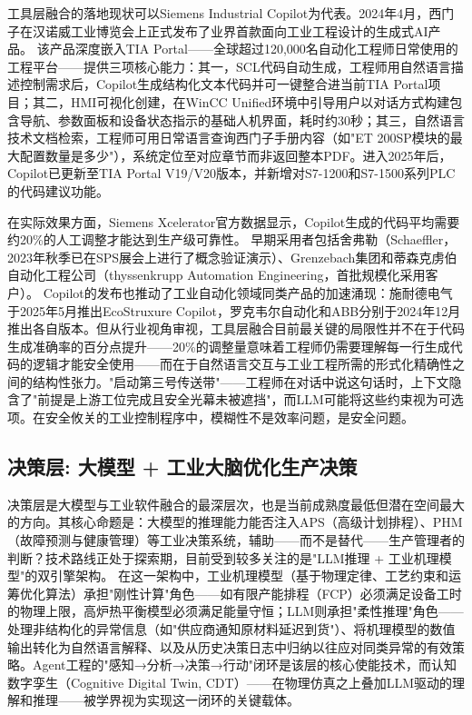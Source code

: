 \documentclass[12pt,a4paper]{ctexart}
\begin{document}
工具层融合的落地现状可以Siemens Industrial Copilot为代表。2024年4月，西门子在汉诺威工业博览会上正式发布了业界首款面向工业工程设计的生成式AI产品。\cite{siemens2024press} 该产品深度嵌入TIA Portal——全球超过120,000名自动化工程师日常使用的工程平台——提供三项核心能力：其一，SCL代码自动生成，工程师用自然语言描述控制需求后，Copilot生成结构化文本代码并可一键整合进当前TIA Portal项目；其二，HMI可视化创建，在WinCC Unified环境中引导用户以对话方式构建包含导航、参数面板和设备状态指示的基础人机界面，耗时约30秒；其三，自然语言技术文档检索，工程师可用日常语言查询西门子手册内容（如"ET 200SP模块的最大配置数量是多少"），系统定位至对应章节而非返回整本PDF。进入2025年后，Copilot已更新至TIA Portal V19/V20版本，并新增对S7-1200和S7-1500系列PLC的代码建议功能。\cite{devicebase2025copilot}

在实际效果方面，Siemens Xcelerator官方数据显示，Copilot生成的代码平均需要约20\%的人工调整才能达到生产级可靠性。\cite{siemens2024xcelerator} 早期采用者包括舍弗勒（Schaeffler，2023年秋季已在SPS展会上进行了概念验证演示）、Grenzebach集团和蒂森克虏伯自动化工程公司（thyssenkrupp Automation Engineering，首批规模化采用客户）。\cite{marketscreener2024siemens} Copilot的发布也推动了工业自动化领域同类产品的加速涌现：施耐德电气于2025年5月推出EcoStruxure Copilot，罗克韦尔自动化和ABB分别于2024年12月推出各自版本。但从行业视角审视，工具层融合目前最关键的局限性并不在于代码生成准确率的百分点提升——20\%的调整量意味着工程师仍需要理解每一行生成代码的逻辑才能安全使用——而在于自然语言交互与工业工程所需的形式化精确性之间的结构性张力。"启动第三号传送带"——工程师在对话中说这句话时，上下文隐含了"前提是上游工位完成且安全光幕未被遮挡"，而LLM可能将这些约束视为可选项。在安全攸关的工业控制程序中，模糊性不是效率问题，是安全问题。

\subsection{决策层: 大模型 + 工业大脑优化生产决策}

决策层是大模型与工业软件融合的最深层次，也是当前成熟度最低但潜在空间最大的方向。其核心命题是：大模型的推理能力能否注入APS（高级计划排程）、PHM（故障预测与健康管理）等工业决策系统，辅助——而不是替代——生产管理者的判断？技术路线正处于探索期，目前受到较多关注的是"LLM推理 + 工业机理模型"的双引擎架构。\cite{jms2025ifm} 在这一架构中，工业机理模型（基于物理定律、工艺约束和运筹优化算法）承担"刚性计算"角色——如有限产能排程（FCP）必须满足设备工时的物理上限，高炉热平衡模型必须满足能量守恒；LLM则承担"柔性推理"角色——处理非结构化的异常信息（如"供应商通知原材料延迟到货"）、将机理模型的数值输出转化为自然语言解释、以及从历史决策日志中归纳以往应对同类异常的有效策略。Agent工程的"感知→分析→决策→行动"闭环是该层的核心使能技术，而认知数字孪生（Cognitive Digital Twin, CDT）——在物理仿真之上叠加LLM驱动的理解和推理——被学界视为实现这一闭环的关键载体。\cite{jiic2025cdtllm}
\end{document}
